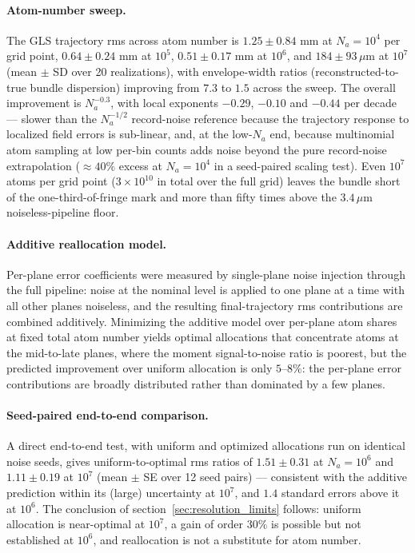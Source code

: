 \documentclass[11pt,a4paper]{article}
\begin{document}
\paragraph{Atom-number sweep.} The GLS trajectory rms across atom number is $1.25 \pm 0.84$ mm at $N_a = 10^4$ per grid point, $0.64 \pm 0.24$ mm at $10^5$, $0.51 \pm 0.17$ mm at $10^6$, and $184 \pm 93\,\mu$m at $10^7$ (mean $\pm$ SD over 20 realizations), with envelope-width ratios (reconstructed-to-true bundle dispersion) improving from $7.3$ to $1.5$ across the sweep. The overall improvement is $N_a^{-0.3}$, with local exponents $-0.29$, $-0.10$ and $-0.44$ per decade --- slower than the $N_a^{-1/2}$ record-noise reference because the trajectory response to localized field errors is sub-linear, and, at the low-$N_a$ end, because multinomial atom sampling at low per-bin counts adds noise beyond the pure record-noise extrapolation ($\approx 40\%$ excess at $N_a = 10^4$ in a seed-paired scaling test). Even $10^7$ atoms per grid point ($3\times 10^{10}$ in total over the full grid) leaves the bundle short of the one-third-of-fringe mark and more than fifty times above the $3.4\,\mu$m noiseless-pipeline floor.

\paragraph{Additive reallocation model.} Per-plane error coefficients were measured by single-plane noise injection through the full pipeline: noise at the nominal level is applied to one plane at a time with all other planes noiseless, and the resulting final-trajectory rms contributions are combined additively. Minimizing the additive model over per-plane atom shares at fixed total atom number yields optimal allocations that concentrate atoms at the mid-to-late planes, where the moment signal-to-noise ratio is poorest, but the predicted improvement over uniform allocation is only $5$--$8\%$: the per-plane error contributions are broadly distributed rather than dominated by a few planes.

\paragraph{Seed-paired end-to-end comparison.} A direct end-to-end test, with uniform and optimized allocations run on identical noise seeds, gives uniform-to-optimal rms ratios of $1.51 \pm 0.31$ at $N_a = 10^6$ and $1.11 \pm 0.19$ at $10^7$ (mean $\pm$ SE over 12 seed pairs) --- consistent with the additive prediction within its (large) uncertainty at $10^7$, and $1.4$ standard errors above it at $10^6$. The conclusion of section~\ref{sec:resolution_limits} follows: uniform allocation is near-optimal at $10^7$, a gain of order $30\%$ is possible but not established at $10^6$, and reallocation is not a substitute for atom number.
\end{document}
